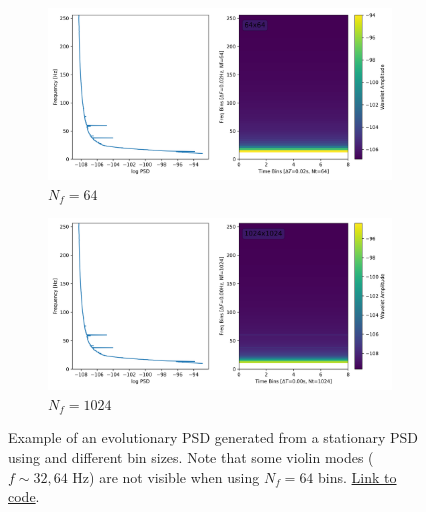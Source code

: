 \documentclass{article}
\begin{document}
\begin{figure}
  \centering

  \begin{subfigure}{0.5\textwidth}
    \centering
    \includegraphics[width=\linewidth]{figures/PSD/psd_wavelet_64.png}
    \caption{$N_f=64$}
  \end{subfigure}

  \begin{subfigure}{0.5\textwidth}
    \centering
    \includegraphics[width=\linewidth]{figures/PSD/psd_wavelet_1024.png}
    \caption{$N_f=1024$}
  \end{subfigure}

  \caption{Example of an evolutionary PSD generated from a stationary PSD using and different bin sizes. Note that some violin modes ($f\sim32, 64$ Hz) are not visible when using $N_f=64$ bins. \href{https://github.com/avivajpeyi/pywavelet/blob/main/tests/test_psd.py}{Link to code}.}
\end{figure}

\newpage
\end{document}
